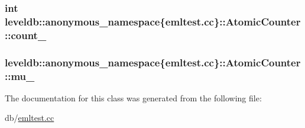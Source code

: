 \subsubsection[{count\+\_\+}]{\setlength{\rightskip}{0pt plus 5cm}int leveldb\+::anonymous\+\_\+namespace\{emltest.\+cc\}\+::Atomic\+Counter\+::count\+\_\+\hspace{0.3cm}{\ttfamily [private]}}\label{classleveldb_1_1anonymous__namespace_02emltest_8cc_03_1_1_atomic_counter_ab49b121f2e825cd0896e9133a168e5f3}
\hypertarget{classleveldb_1_1anonymous__namespace_02emltest_8cc_03_1_1_atomic_counter_a7bc85730a55754e91c94bb0835d91167}{}
\subsubsection[{mu\+\_\+}]{ leveldb\+::anonymous\+\_\+namespace\{emltest.\+cc\}\+::Atomic\+Counter\+::mu\+\_\+\hspace{0.3cm}{\ttfamily [private]}}\label{classleveldb_1_1anonymous__namespace_02emltest_8cc_03_1_1_atomic_counter_a7bc85730a55754e91c94bb0835d91167}


The documentation for this class was generated from the following file\+:\begin{DoxyCompactItemize}
\item 
db/\hyperlink{emltest_8cc}{emltest.\+cc}\end{DoxyCompactItemize}
